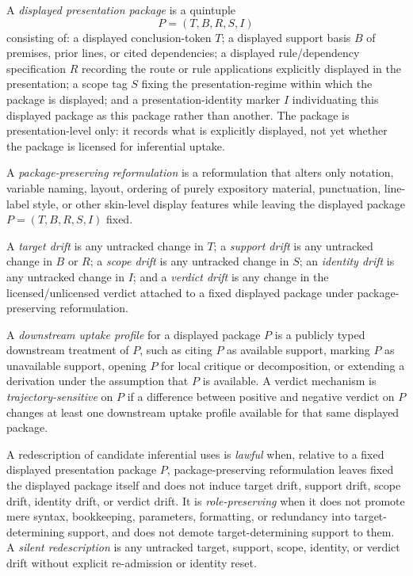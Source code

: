 \begin{definition}
\label{def:A-redescription}
A \emph{displayed presentation package} is a quintuple
\[
P=(T,B,R,S,I)
\]
consisting of: a displayed conclusion-token $T$; a displayed support basis $B$ of premises, prior lines, or cited dependencies; a displayed rule/dependency specification $R$ recording the route or rule applications explicitly displayed in the presentation; a scope tag $S$ fixing the presentation-regime within which the package is displayed; and a presentation-identity marker $I$ individuating this displayed package as this package rather than another. The package is presentation-level only: it records what is explicitly displayed, not yet whether the package is licensed for inferential uptake.

A \emph{package-preserving reformulation} is a reformulation that alters only notation, variable naming, layout, ordering of purely expository material, punctuation, line-label style, or other skin-level display features while leaving the displayed package $P=(T,B,R,S,I)$ fixed.

A \emph{target drift} is any untracked change in $T$; a \emph{support drift} is any untracked change in $B$ or $R$; a \emph{scope drift} is any untracked change in $S$; an \emph{identity drift} is any untracked change in $I$; and a \emph{verdict drift} is any change in the licensed/unlicensed verdict attached to a fixed displayed package under package-preserving reformulation.

A \emph{downstream uptake profile} for a displayed package $P$ is a publicly typed downstream treatment of $P$, such as citing $P$ as available support, marking $P$ as unavailable support, opening $P$ for local critique or decomposition, or extending a derivation under the assumption that $P$ is available. A verdict mechanism is \emph{trajectory-sensitive} on $P$ if a difference between positive and negative verdict on $P$ changes at least one downstream uptake profile available for that same displayed package.

A redescription of candidate inferential uses is \emph{lawful} when, relative to a fixed displayed presentation package $P$, package-preserving reformulation leaves fixed the displayed package itself and does not induce target drift, support drift, scope drift, identity drift, or verdict drift. It is \emph{role-preserving} when it does not promote mere syntax, bookkeeping, parameters, formatting, or redundancy into target-determining support, and does not demote target-determining support to them. A \emph{silent redescription} is any untracked target, support, scope, identity, or verdict drift without explicit re-admission or identity reset.
\end{definition}

